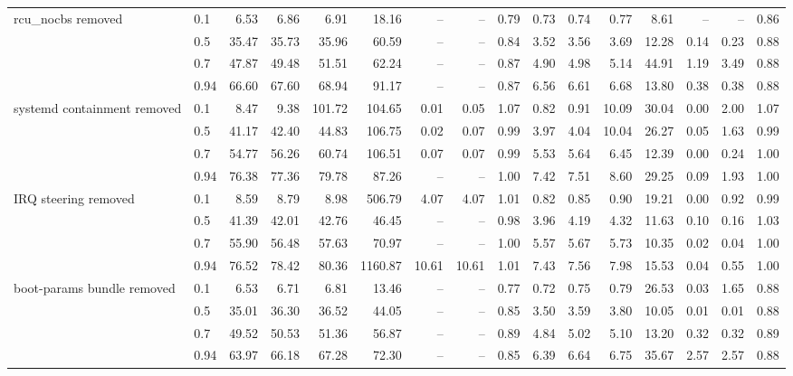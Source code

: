 \begin{table}
{\begin{tabular}{llrrrrrrrrrrrrrr}
\cmidrule{1-16}
\multirow[t]{4}{*}{rcu\_nocbs removed} & 0.1 & 6.53 & 6.86 & 6.91 & 18.16 & -- & -- & 0.79 & 0.73 & 0.74 & 0.77 & 8.61 & -- & -- & 0.86 \\
 & 0.5 & 35.47 & 35.73 & 35.96 & 60.59 & -- & -- & 0.84 & 3.52 & 3.56 & 3.69 & 12.28 & 0.14 & 0.23 & 0.88 \\
 & 0.7 & 47.87 & 49.48 & 51.51 & 62.24 & -- & -- & 0.87 & 4.90 & 4.98 & 5.14 & 44.91 & 1.19 & 3.49 & 0.88 \\
 & 0.94 & 66.60 & 67.60 & 68.94 & 91.17 & -- & -- & 0.87 & 6.56 & 6.61 & 6.68 & 13.80 & 0.38 & 0.38 & 0.88 \\
\cmidrule{1-16}
\multirow[t]{4}{*}{systemd containment removed} & 0.1 & 8.47 & 9.38 & 101.72 & 104.65 & 0.01 & 0.05 & 1.07 & 0.82 & 0.91 & 10.09 & 30.04 & 0.00 & 2.00 & 1.07 \\
 & 0.5 & 41.17 & 42.40 & 44.83 & 106.75 & 0.02 & 0.07 & 0.99 & 3.97 & 4.04 & 10.04 & 26.27 & 0.05 & 1.63 & 0.99 \\
 & 0.7 & 54.77 & 56.26 & 60.74 & 106.51 & 0.07 & 0.07 & 0.99 & 5.53 & 5.64 & 6.45 & 12.39 & 0.00 & 0.24 & 1.00 \\
 & 0.94 & 76.38 & 77.36 & 79.78 & 87.26 & -- & -- & 1.00 & 7.42 & 7.51 & 8.60 & 29.25 & 0.09 & 1.93 & 1.00 \\
\cmidrule{1-16}
\multirow[t]{4}{*}{IRQ steering removed} & 0.1 & 8.59 & 8.79 & 8.98 & 506.79 & 4.07 & 4.07 & 1.01 & 0.82 & 0.85 & 0.90 & 19.21 & 0.00 & 0.92 & 0.99 \\
 & 0.5 & 41.39 & 42.01 & 42.76 & 46.45 & -- & -- & 0.98 & 3.96 & 4.19 & 4.32 & 11.63 & 0.10 & 0.16 & 1.03 \\
 & 0.7 & 55.90 & 56.48 & 57.63 & 70.97 & -- & -- & 1.00 & 5.57 & 5.67 & 5.73 & 10.35 & 0.02 & 0.04 & 1.00 \\
 & 0.94 & 76.52 & 78.42 & 80.36 & 1160.87 & 10.61 & 10.61 & 1.01 & 7.43 & 7.56 & 7.98 & 15.53 & 0.04 & 0.55 & 1.00 \\
\cmidrule{1-16}
\multirow[t]{4}{*}{boot-params bundle removed} & 0.1 & 6.53 & 6.71 & 6.81 & 13.46 & -- & -- & 0.77 & 0.72 & 0.75 & 0.79 & 26.53 & 0.03 & 1.65 & 0.88 \\
 & 0.5 & 35.01 & 36.30 & 36.52 & 44.05 & -- & -- & 0.85 & 3.50 & 3.59 & 3.80 & 10.05 & 0.01 & 0.01 & 0.88 \\
 & 0.7 & 49.52 & 50.53 & 51.36 & 56.87 & -- & -- & 0.89 & 4.84 & 5.02 & 5.10 & 13.20 & 0.32 & 0.32 & 0.89 \\
 & 0.94 & 63.97 & 66.18 & 67.28 & 72.30 & -- & -- & 0.85 & 6.39 & 6.64 & 6.75 & 35.67 & 2.57 & 2.57 & 0.88 \\

\end{tabular}}
\end{table}
